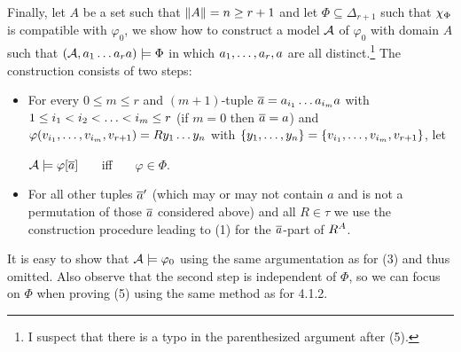 \begin{enumerate}[1.]
Finally, let $A$ be a set such that $\|A\| = n \geq r + 1$ and let $\Phi \subseteq \Delta_{r + 1}$ such that $\extaxm[\Phi]$ is compatible with $\varphi_0$, we show how to construct a model $\mathcal{A}$ of $\varphi_0$ with domain $A$ such that $(\mathcal{A}, a_1 \ldots a_ra) \models \Phi$ in which $a_1, \ldots, a_r, a$ are all distinct.\footnote{I suspect that there is a typo in the parenthesized argument after (5).} The construction consists of two steps:
\begin{itemize}
\item For every $0 \leq m \leq r$ and $(m + 1)$-tuple $\overline{a} = a_{i_1} \ldots a_{i_m}a$ with $1 \leq i_1 < i_2 < \ldots < i_m \leq r$ (if $m = 0$ then $\overline{a} = a$) and $\varphi(v_{i_1}, \ldots, v_{i_m}, v_{r + 1}) = Ry_1 \ldots y_n$ with ${\{y_1, \ldots, y_n\}} = {\{v_{i_1}, \ldots, v_{i_m}, v_{r + 1}\}}$, let
\begin{center}
$\mathcal{A} \models \varphi [\overline{a}]$ \ \ \ iff \ \ \ $\varphi \in \Phi$.
\end{center}
\item For all other tuples $\overline{a}'$ (which may or may not contain $a$ and is not a permutation of those $\overline{a}$ considered above) and all $R \in \tau$ we use the construction procedure leading to (1) for the $\overline{a}$-part of $R^{A}$.
\end{itemize}
It is easy to show that $\mathcal{A} \models \varphi_0$ using the same argumentation as for (3) and thus omitted. Also observe that the second step is independent of $\Phi$, so we can focus on $\Phi$ when proving (5) using the same method as for 4.1.2.
%
\end{enumerate}


\setcounter{section}{2}
